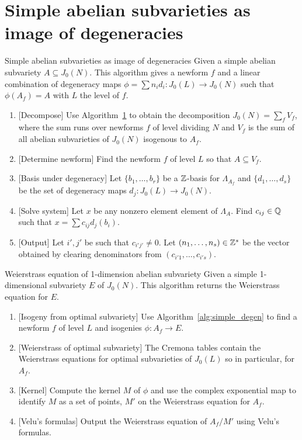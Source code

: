 \documentclass[11pt, proquest]{uwthesis}
\begin{document}
\section{Simple abelian subvarieties as image of degeneracies}
\begin{algorithm}{Simple abelian subvarieties as image of degeneracies}%
    \label{alg:simple_degen}
    Given a simple abelian subvariety $A\subseteq J_0(N)$. This algorithm
    gives a newform $f$ and a linear combination of degeneracy maps
    $\phi=\sum n_i d_i:J_0(L)\to J_0(N)$ such that $\phi(A_f)=A$ with $L$ the
    level of $f$.
    \begin{enumerate}
        \item{} [Decompose]
            Use Algorithm~\ref{} to obtain the decomposition $J_0(N)=\sum_f
            V_f$, where the sum runs over newforms $f$ of level dividing $N$
            and $V_f$ is the sum of all abelian subvarieties of $J_0(N)$
            isogenous to $A_f$.
        \item{} [Determine newform]
            Find the newform $f$ of level $L$ so that $A\subseteq V_f$.
        \item{} [Basis under degeneracy]
            Let $\{b_1,\ldots,b_r\}$ be a $\mathbb{Z}$-basis for $\Lambda_{A_f}$ and
            $\{d_1,\ldots,d_s\}$ be the set of degeneracy maps $d_j:J_0(L)\to
            J_0(N)$.
        \item{} [Solve system]
            Let $x$ be any nonzero element element of $\Lambda_A$. Find
            $c_{ij}\in \mathbb{Q}$ such that $x=\sum c_{ij} d_j(b_i)$.
        \item{} [Output]
            Let $i', j'$ be such that $c_{i'j'}\neq 0$. Let
            $(n_1,\ldots,n_s)\in \mathbb{Z}^s$ be the vector obtained by
            clearing denominators from $(c_{i'1},\ldots,c_{i's})$.
    \end{enumerate}
\end{algorithm}


\begin{algorithm}{Weierstrass equation of 1-dimension abelian subvariety}%
    \label{alg:weierstrass}
    Given a simple 1-dimensional subvariety $E$ of $J_0(N)$. This algorithm
    returns the Weierstrass equation for $E$.
    \begin{enumerate}
        \item{}
            [Isogeny from optimal subvariety] Use
            Algorithm~\ref{alg:simple_degen} to find a newform $f$ of level
            $L$ and isogenies $\phi:A_f\to E$.
        \item{}
            [Weierstrass of optimal subvariety] The Cremona tables contain the
            Weierstrass equations for optimal subvarieties of $J_0(L)$ so in
            particular, for $A_f$.
        \item{}
            [Kernel] Compute the kernel $M$ of $\phi$ and use the complex
            exponential map to identify $M$ as a set of points, $M'$ on the
            Weierstrass equation for $A_f$.
        \item{}
            [Velu's formulas] Output the Weierstrass equation of $A_f/M'$ using
            Velu's formulas.
    \end{enumerate}
\end{algorithm}
\end{document}
